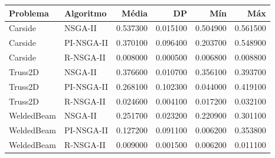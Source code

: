 \begin{tabular}{llrrrr}
\toprule
Problema & Algoritmo & Média & DP & Mín & Máx \\
\midrule
Carside & NSGA-II & 0.537300 & 0.015100 & 0.504900 & 0.561500 \\
Carside & PI-NSGA-II & 0.370100 & 0.096400 & 0.203700 & 0.548900 \\
Carside & R-NSGA-II & 0.008000 & 0.000500 & 0.006800 & 0.008800 \\
Truss2D & NSGA-II & 0.376600 & 0.010700 & 0.356100 & 0.393700 \\
Truss2D & PI-NSGA-II & 0.268100 & 0.102300 & 0.044000 & 0.419100 \\
Truss2D & R-NSGA-II & 0.024600 & 0.004100 & 0.017200 & 0.032100 \\
WeldedBeam & NSGA-II & 0.251700 & 0.023200 & 0.220900 & 0.301100 \\
WeldedBeam & PI-NSGA-II & 0.127200 & 0.091100 & 0.006200 & 0.353800 \\
WeldedBeam & R-NSGA-II & 0.009000 & 0.001500 & 0.006200 & 0.011100 \\
\bottomrule
\end{tabular}
